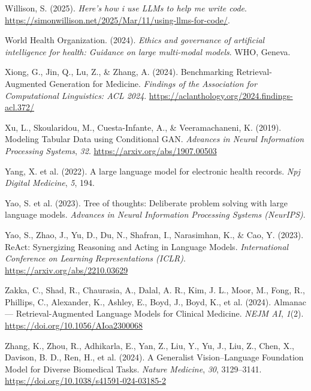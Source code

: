 \documentclass[
  letterpaper,
  11pt]{scrbook}
\newlength{\cslhangindent}
\newenvironment{CSLReferences}[2] %
 {\begin{list}{}{%
  \setlength{\itemindent}{0pt}
  \setlength{\leftmargin}{0pt}
  \setlength{\parsep}{0pt}
  \ifodd #1
   \setlength{\leftmargin}{\cslhangindent}
   \setlength{\itemindent}{-1\cslhangindent}
  \fi
  \setlength{\itemsep}{#2\baselineskip}}}
 {\end{list}}
\begin{document}
\begin{CSLReferences}{1}{0}
Willison, S. (2025). \emph{Here's how i use {LLMs} to help me write
code}. \url{https://simonwillison.net/2025/Mar/11/using-llms-for-code/}.

World Health Organization. (2024). \emph{Ethics and governance of
artificial intelligence for health: Guidance on large multi-modal
models}. WHO, Geneva.

Xiong, G., Jin, Q., Lu, Z., \& Zhang, A. (2024). {Benchmarking
Retrieval-Augmented Generation for Medicine}. \emph{Findings of the
Association for Computational Linguistics: ACL 2024}.
\url{https://aclanthology.org/2024.findings-acl.372/}

Xu, L., Skoularidou, M., Cuesta-Infante, A., \& Veeramachaneni, K.
(2019). {Modeling Tabular Data using Conditional GAN}. \emph{Advances in
Neural Information Processing Systems}, \emph{32}.
\url{https://arxiv.org/abs/1907.00503}

{Yang, X. et al.} (2022). A large language model for electronic health
records. \emph{Npj Digital Medicine}, \emph{5}, 194.

{Yao, S. et al.} (2023). Tree of thoughts: Deliberate problem solving
with large language models. \emph{Advances in Neural Information
Processing Systems (NeurIPS)}.

Yao, S., Zhao, J., Yu, D., Du, N., Shafran, I., Narasimhan, K., \& Cao,
Y. (2023). {ReAct}: {Synergizing Reasoning and Acting in Language
Models}. \emph{International Conference on Learning Representations
(ICLR)}. \url{https://arxiv.org/abs/2210.03629}

{Zakka, C., Shad, R., Chaurasia, A., Dalal, A. R., Kim, J. L., Moor, M.,
Fong, R., Phillips, C., Alexander, K., Ashley, E., Boyd, J., Boyd, K.,
et al.} (2024). {Almanac --- Retrieval-Augmented Language Models for
Clinical Medicine}. \emph{NEJM AI}, \emph{1}(2).
\url{https://doi.org/10.1056/AIoa2300068}

{Zhang, K., Zhou, R., Adhikarla, E., Yan, Z., Liu, Y., Yu, J., Liu, Z.,
Chen, X., Davison, B. D., Ren, H., et al.} (2024). {A Generalist
Vision--Language Foundation Model for Diverse Biomedical Tasks}.
\emph{Nature Medicine}, \emph{30}, 3129--3141.
\url{https://doi.org/10.1038/s41591-024-03185-2}


\end{CSLReferences}
\end{document}
